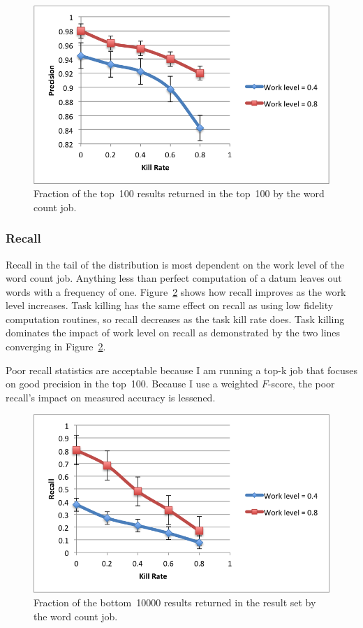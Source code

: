 \documentclass[12pt,twocolumn]{article}
\begin{document}
\begin{figure}
\includegraphics[width=\linewidth]{top-100-precision.png}
\caption{Fraction of the top~100 results returned in the top~100 by the word count job.}
\label{fig:precision}
\end{figure}

\subsubsection{Recall}
Recall in the tail of the distribution is most dependent on the work level of the word count
job.
Anything less than perfect computation of a datum leaves out words with a frequency of one.
Figure~\ref{fig:recall} shows how recall improves as the work level increases. Task killing has
the same effect on recall as using low fidelity computation routines, so recall decreases as
the task kill rate does. Task killing dominates the impact of work level on recall as
demonstrated
by the two lines converging in Figure~\ref{fig:recall}.

Poor recall statistics are acceptable because I am running a top-k job that focuses
on good precision in the top~100. Because I use a weighted $F$-score, the poor recall's
impact
on measured accuracy is lessened.

\begin{figure}
\includegraphics[width=\linewidth]{recall.png}
\caption{Fraction of the bottom~10000 results returned in the result set by the word count
job.}
\label{fig:recall}
\end{figure}
\end{document}
